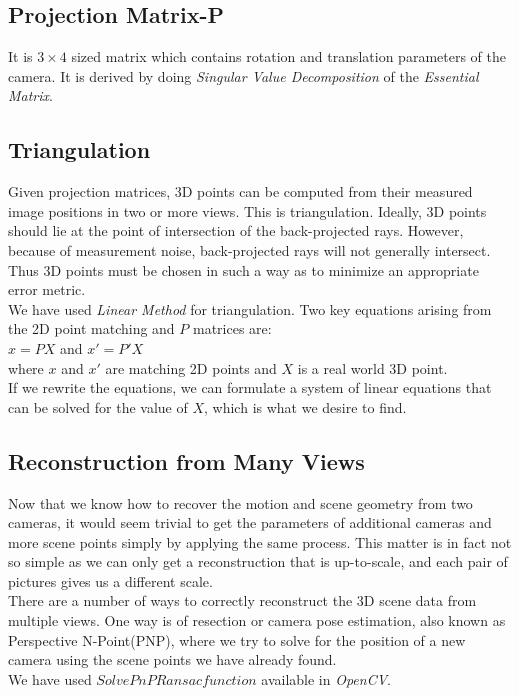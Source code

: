 \documentclass{article}
\begin{document}
\subsection{Projection Matrix-P}
It is $3 \times 4$ sized matrix which contains rotation and translation parameters of the camera. It is derived by doing \emph{Singular Value Decomposition} of the \emph{Essential Matrix}.

\subsection{Triangulation}
Given projection matrices, 3D points can be computed from their measured image positions in two or more views. This is
triangulation. Ideally, 3D points should lie at the point of intersection of the back-projected rays. However,
because of measurement noise, back-projected rays will not generally intersect. Thus 3D points must be chosen in such a way as to minimize an appropriate error metric.\\
We have used \emph{Linear Method} for triangulation. Two key equations arising from the 2D point matching and $P$ matrices are:\\
$x=PX$ and $x'=P'X$\\
where $x$ and $x'$ are matching 2D points and $X$ is a real world 3D point.\\
If we rewrite the equations, we can formulate a system of linear equations that can be solved for the value of $X$, which is what we desire to find.

\subsection{Reconstruction from Many Views}
Now that we know how to recover the motion and scene geometry from two cameras, it would seem trivial to get the parameters of additional cameras and more scene points simply by applying the same process. This matter is in fact not so simple as we can only get a reconstruction that is up-to-scale, and each pair of pictures gives us a different scale.\\
There are a number of ways to correctly reconstruct the 3D scene data from multiple views. One way is of resection or camera pose estimation, also known as Perspective N-Point(PNP), where we try to solve for the position of a new camera using the scene points we have already found.\\
We have used $SolvePnPRansacfunction$ available in \emph{OpenCV}.
\end{document}
